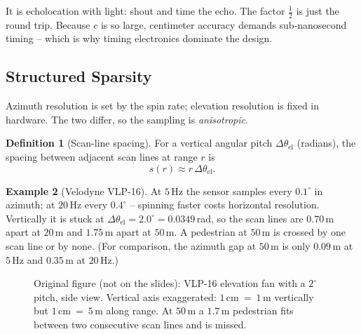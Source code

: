 \documentclass[11pt,a4paper]{article}
\theoremstyle{definition}
\newtheorem{definition}{Definition}[section]
\newtheorem{example}[definition]{Example}
\theoremstyle{plain}
\theoremstyle{remark}
\begin{document}
\begin{intuition}
It is echolocation with light: shout and time the echo. The factor $\tfrac12$ is just the round trip. Because $c$ is so large, centimeter accuracy demands sub-nanosecond timing -- which is why timing electronics dominate the design.
\end{intuition}
 
\subsection{Structured Sparsity }
 
Azimuth resolution is set by the spin rate; elevation resolution is fixed in hardware. The two differ, so the sampling is \emph{anisotropic}.
 
\begin{definition}[Scan-line spacing]
For a vertical angular pitch $\Delta\theta_{\text{el}}$ (radians), the spacing between adjacent scan lines at range $r$ is
\[
s(r)\approx r\,\Delta\theta_{\text{el}}.
\]
\end{definition}
 
\begin{example}[Velodyne VLP-16]
At $5$\,Hz the sensor samples every $0.1^\circ$ in azimuth; at $20$\,Hz every $0.4^\circ$ -- spinning faster costs horizontal resolution. Vertically it is stuck at $\Delta\theta_{\text{el}}=2.0^\circ=0.0349$\,rad, so the scan lines are $0.70$\,m apart at $20$\,m and $1.75$\,m apart at $50$\,m. A pedestrian at $50$\,m is crossed by one scan line or by none. (For comparison, the azimuth gap at $50$\,m is only $0.09$\,m at $5$\,Hz and $0.35$\,m at $20$\,Hz.)
\end{example}
 
\begin{figure}[htbp]
\centering
{}
\caption{Original figure (not on the slides): VLP-16 elevation fan with a $2^\circ$ pitch, side view. Vertical axis exaggerated: $1$\,cm~=~$1$\,m vertically but $1$\,cm~=~$5$\,m along range. At $50$\,m a $1.7$\,m pedestrian fits between two consecutive scan lines and is missed.}
\end{figure}
 
\end{document}
